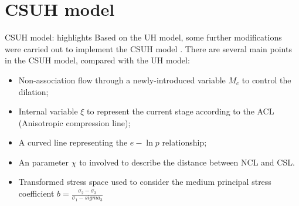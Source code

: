 \documentclass[aspectratio=169]{beamer}
\begin{document}
\section{CSUH model}

\begin{frame}{CSUH model: highlights}
    Based on the UH model, some further modifications were carried out to implement the CSUH model \cite{UHmodelYao2019b}. There are several main points in the CSUH model, compared with the UH model:
    \begin{itemize}
        \item Non-association flow through a newly-introduced variable $M_c$ to control the dilation;
        \item Internal variable $\xi$ to represent the current stage according to the ACL (Anisotropic compression line);
        \item A curved line representing the $e-\ln{p}$ relationship;
        \item An parameter $\chi$ to involved to describe the distance between NCL and CSL.
        \item Transformed stress space used to consider the medium principal stress coefficient $b = \frac{\sigma_2 - \sigma_3}{\sigma_{1}-sigma_{3}}$
    \end{itemize}
\end{frame}
\end{document}
